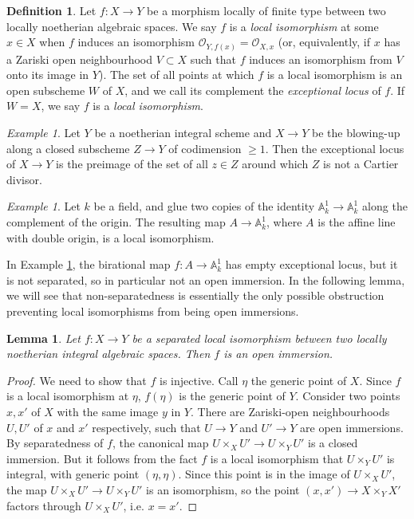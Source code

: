 \documentclass[a4paper,10pt,twoside]{article}
\newcommand{\ra}{\rightarrow}
\renewcommand{\O}{\mathcal{O}}
\newcommand{\A}{\mathbb{A}}
\newtheorem{lem}[thm]{Lemma}
\theoremstyle{definition}
\newtheorem{defi}[thm]{Definition}
\theoremstyle{remark}
\newtheorem{ex}[thm]{Example}
\begin{document}
\begin{defi}
Let $f:X\ra Y$ be a morphism locally of finite type between two locally noetherian algebraic spaces. We say $f$ is a \emph{local isomorphism} at some $x\in X$ when $f$ induces an isomorphism $\O_{Y,f(x)}=\O_{X,x}$ (or, equivalently, if $x$ has a Zariski open neighbourhood $V\subset X$ such that $f$ induces an isomorphism from $V$ onto its image in $Y$). The set of all points at which $f$ is a local isomorphism is an open subscheme $W$ of $X$, and we call its complement the \emph{exceptional locus} of $f$. If $W=X$, we say $f$ is a \emph{local isomorphism}.
\end{defi}

\begin{ex}
Let $Y$ be a noetherian integral scheme and $X\rightarrow Y$ be the blowing-up along a closed subscheme $Z\rightarrow Y$ of codimension $\geq 1$. Then the exceptional locus of $X\rightarrow Y$ is the preimage of the set of all $z\in Z$ around which $Z$ is not a Cartier divisor.
\end{ex}

\begin{ex}\label{example local iso but not open immersion}
Let $k$ be a field, and glue two copies of the identity $\A_k^1\rightarrow \A_k^1$ along the complement of the origin. The resulting map $A\rightarrow \A_k^1$, where $A$ is the affine line with double origin, is a local isomorphism.
\end{ex}

In Example \ref{example local iso but not open immersion}, the birational map $f\colon A \rightarrow \A_k^1$ has empty exceptional locus, but it is not separated, so in particular not an open immersion. In the following lemma, we will see that non-separatedness is essentially the only possible obstruction preventing local isomorphisms from being open immersions.

\begin{lem}\label{lemme un iso local separe est une immersion ouverte}
Let $f\colon X\to Y$ be a separated local isomorphism between two locally noetherian integral algebraic spaces. Then $f$ is an open immersion.
\end{lem}

\begin{proof}
We need to show that $f$ is injective. Call $\eta$ the generic point of $X$. Since $f$ is a local isomorphism at $\eta$, $f(\eta)$ is the generic point of $Y$. Consider two points $x,x'$ of $X$ with the same image $y$ in $Y$. There are Zariski-open neighbourhoods $U,U'$ of $x$ and $x'$ respectively, such that $U \to Y$ and $U'\to Y$ are open immersions. By separatedness of $f$, the canonical map $U\times_X U'\to U\times_Y U'$ is a closed immersion. But it follows from the fact $f$ is a local isomorphism that $U\times_Y U'$ is integral, with generic point $(\eta,\eta)$. Since this point is in the image of $U\times_X U'$, the map $U\times_X U'\to U\times_Y U'$ is an isomorphism, so the point $(x,x')\to X\times_Y X'$ factors through $U\times_X U'$, i.e. $x=x'$.
\end{proof}
\end{document}
